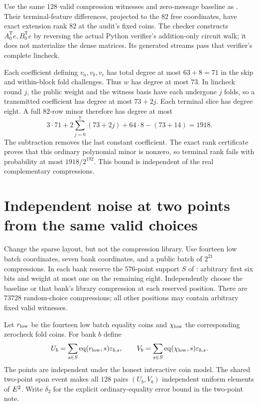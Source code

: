 \documentclass[11pt]{article}
\begin{document}
Use the same $128$ valid compression witnesses and zero-message baseline as . Their terminal-feature differences, projected to the $82$ free coordinates, have exact extension rank $82$ at the audit's fixed coins. The checker constructs $A_0^{\mathsf T}e,B_0^{\mathsf T}e$ by reversing the actual Python verifier's addition-only circuit walk; it does not materialize the dense matrices. Its generated streams pass that verifier's complete lincheck.

Each coefficient defining $v_a,v_b,v_c$ has total degree at most $63+8=71$ in the skip and within-block fold challenges. Thus $w$ has degree at most $73$. In lincheck round $j$, the public weight and the witness basis have each undergone $j$ folds, so a transmitted coefficient has degree at most $73+2j$. Each terminal slice has degree eight. A full $82$-row minor therefore has degree at most
\[
 3\cdot71+2\sum_{j=0}^7(73+2j)+64\cdot8-(73+14)=1918.
\]
The subtraction removes the last constant coefficient. The exact rank certificate proves that this ordinary polynomial minor is nonzero, so terminal rank fails with probability at most $1918/2^{192}$. This bound is independent of the real complementary compressions.

\section{Independent noise at two points from the same valid choices}

Change the sparse layout, but not the compression library. Use fourteen low batch coordinates, seven bank coordinates, and a public batch of $2^{21}$ compressions. In each bank reserve the $576$-point support $S$ of : arbitrary first six bits and weight at most one on the remaining eight. Independently choose the baseline or that bank's library compression at each reserved position. There are $73728$ random-choice compressions; all other positions may contain arbitrary fixed valid witnesses.

Let $r_{\rm low}$ be the fourteen low batch equality coins and $\chi_{\rm low}$ the corresponding zerocheck fold coins. For bank $b$ define
\[
 U_b=\sum_{s\in S}\operatorname{eq}(r_{\rm low},s)\varepsilon_{b,s},\qquad
 V_b=\sum_{s\in S}\operatorname{eq}(\chi_{\rm low},s)\varepsilon_{b,s}.
\]
The points are independent under the honest interactive coin model. The shared two-point span event makes all $128$ pairs $(U_b,V_b)$ independent uniform elements of $E^2$. Write $\delta_2$ for the explicit ordinary-equality error bound in the two-point note.
\end{document}
